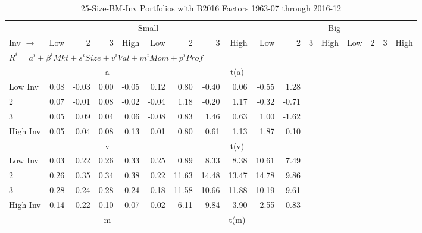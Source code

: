 
\begin{table}[h]
\centering
\caption{25-Size-BM-Inv Portfolios with B2016 Factors 1963-07 through 2016-12}
\begin{tabular}{lrrrrrrrrrrrrrrrr}
  \toprule
    & \multicolumn{8}{c}{Small} & \multicolumn{8}{c}{Big} \\
      \cmidrule(r){2-9} \cmidrule(r){10-17}
    Inv $\rightarrow$ & Low & 2 & 3 & High & Low & 2 & 3 & High & Low & 2 & 3 & High & Low & 2 & 3 & High \\ 
  \midrule
  \multicolumn{11}{l}{$R^i=a^i+\beta^iMkt+s^iSize+v^iVal+m^iMom+p^iProf$} \\

  
    
      & \multicolumn{5}{c}{a} & \multicolumn{5}{c}{t(a)}
    
    \\
      \cmidrule(r){2-5} \cmidrule(r){6-9} \cmidrule(r){10-13} \cmidrule(r){14-17}

    Low Inv   & 0.08  & -0.03  & 0.00  & -0.05  & 0.12  & 0.80  & -0.40  & 0.06  & -0.55  & 1.28  \\
           2  & 0.07  & -0.01  & 0.08  & -0.02  & -0.04  & 1.18  & -0.20  & 1.17  & -0.32  & -0.71  \\
           3  & 0.05  & 0.09  & 0.04  & 0.06  & -0.08  & 0.83  & 1.46  & 0.63  & 1.00  & -1.62  \\
    High Inv  & 0.05  & 0.04  & 0.08  & 0.13  & 0.01  & 0.80  & 0.61  & 1.13  & 1.87  & 0.10  \\

  
    
      & \multicolumn{5}{c}{v} & \multicolumn{5}{c}{t(v)}
    
    \\
      \cmidrule(r){2-5} \cmidrule(r){6-9} \cmidrule(r){10-13} \cmidrule(r){14-17}

    Low Inv   & 0.03  & 0.22  & 0.26  & 0.33  & 0.25  & 0.89  & 8.33  & 8.38  & 10.61  & 7.49  \\
           2  & 0.26  & 0.35  & 0.34  & 0.38  & 0.22  & 11.63  & 14.48  & 13.47  & 14.78  & 9.86  \\
           3  & 0.28  & 0.24  & 0.28  & 0.24  & 0.18  & 11.58  & 10.66  & 11.88  & 10.19  & 9.61  \\
    High Inv  & 0.14  & 0.22  & 0.10  & 0.07  & -0.02  & 6.11  & 9.84  & 3.90  & 2.55  & -0.83  \\

  
    
      & \multicolumn{5}{c}{m} & \multicolumn{5}{c}{t(m)}
    

\end{tabular}
\end{table}

